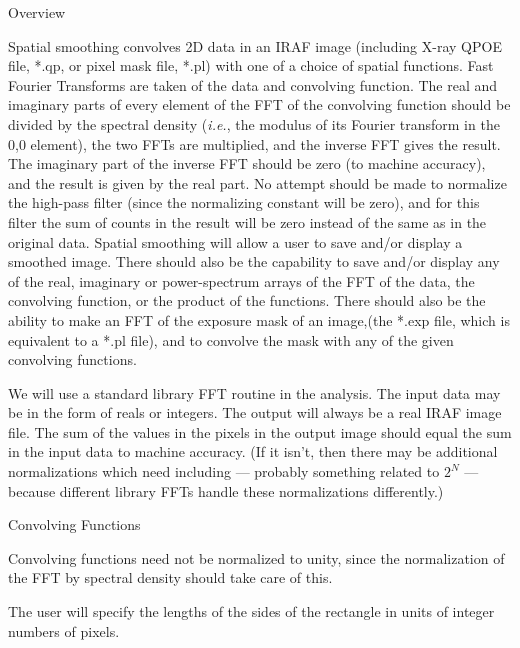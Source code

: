 %
\def\version{Version 1.4 --- 2/2/90}
\def\chapter{Spatial --- Smoothing}
\@{Overview}

Spatial smoothing convolves 2D data in an IRAF image (including X-ray
QPOE file, *.qp, or pixel mask file, *.pl) with one of
a choice of spatial functions.  Fast Fourier Transforms are taken
of the data and convolving function.  The real and imaginary parts of
every element of the FFT of the convolving
function should be divided by the spectral density ({\it i.e.}, the
modulus of its Fourier transform in the 0,0 element), the two FFTs are
multiplied, and the inverse FFT gives the result.  The imaginary part
of the inverse FFT should be zero (to machine accuracy), and the
result is given by the real part.  No attempt should
be made to normalize the high-pass filter
(since the normalizing constant will be zero), and for this
filter the sum of counts in the result will be zero instead of the same as in the
original data.
Spatial smoothing will allow a user to save and/or display a
smoothed image.  There should also be the capability to
save and/or display any of the real, imaginary or power-spectrum
arrays of the FFT of the data, the convolving function, or the
product of the functions.  There should also be the ability to
make an FFT of the exposure mask of an image,(the *.exp file, which is
equivalent to a *.pl file), and to convolve the
mask with any of the given convolving functions.

We will use a standard library FFT routine in the analysis.  The
input data may be in the form of reals or integers.  The output
will always be a real IRAF image file.  The sum of the values in the pixels in the
output image should equal the sum in the input data to machine
accuracy.  (If it isn't, then there may be additional normalizations
which need including --- probably something related to $2^N$ ---
because different library FFTs handle these normalizations differently.)

\@{Convolving Functions}

Convolving functions need not be normalized to unity, since the
normalization of the FFT by spectral density should take care of this.


{\list 

The user will specify the lengths of the sides of the rectangle
in units of integer numbers of pixels.

}

